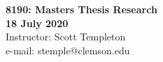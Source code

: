 
\let\counterwithout\relax
\let\counterwithin\relax
{}



\noindent \textbf{8190: Masters Thesis Research}\\
\noindent \textbf{18 July 2020}\\
\noindent Instructor: Scott Templeton \\
e-mail: stemple@clemson.edu\\
\begin{landscape}


\end{landscape}




